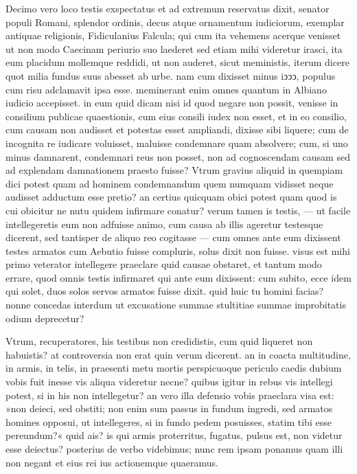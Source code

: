  Decimo vero loco testis exspectatus et ad extremum reservatus dixit, senator populi Romani, splendor ordinis, decus atque ornamentum iudiciorum, exemplar antiquae religionis, Fidiculanius Falcula; qui cum ita vehemens acerque venisset ut non modo Caecinam periurio suo laederet sed etiam mihi videretur irasci, ita eum placidum mollemque reddidi, ut non auderet, sicut meministis, iterum dicere quot milia fundus suus abesset ab urbe. nam cum dixisset minus iↄↄↄ, populus cum risu adclamavit ipsa esse. meminerant enim omnes quantum in Albiano iudicio accepisset.  in eum quid dicam nisi id quod negare non possit, venisse in consilium publicae quaestionis, cum eius consili iudex non esset, et in eo consilio, cum causam non audisset et potestas esset ampliandi, dixisse sibi liquere; cum de incognita re iudicare voluisset, maluisse condemnare quam absolvere; cum, si uno minus damnarent, condemnari reus non posset, non ad cognoscendam causam sed ad explendam damnationem praesto fuisse? Vtrum gravius aliquid in quempiam dici potest quam ad hominem condemnandum quem numquam vidisset neque audisset adductum esse pretio? an certius quicquam obici potest quam quod is cui obicitur ne nutu quidem infirmare conatur?  verum tamen is testis, — ut facile intellegeretis eum non adfuisse animo, cum causa ab illis ageretur testesque dicerent, sed tantisper de aliquo reo cogitasse — cum omnes ante eum dixissent testes armatos cum Aebutio fuisse compluris, solus dixit non fuisse. visus est mihi primo veterator intellegere praeclare quid causae obstaret, et tantum modo errare, quod omnis testis infirmaret qui ante eum dixissent: cum subito, ecce idem qui solet, duos solos servos armatos fuisse dixit. quid huic tu homini facias? nonne concedas interdum ut excusatione summae stultitiae summae improbitatis odium deprecetur?

 Vtrum, recuperatores, his testibus non credidistis, cum quid liqueret non habuistis? at controversia non erat quin verum dicerent. an in coacta multitudine, in armis, in telis, in praesenti metu mortis perspicuoque periculo caedis dubium vobis fuit inesse vis aliqua videretur necne? quibus igitur in rebus vis intellegi potest, si in his non intellegetur? an vero illa defensio vobis praeclara visa est: »non deieci, sed obstiti; non enim sum passus in fundum ingredi, sed armatos homines opposui, ut intellegeres, si in fundo pedem posuisses, statim tibi esse pereundum?« quid ais? is qui armis proterritus, fugatus, pulsus est, non videtur esse deiectus?  posterius de verbo videbimus; nunc rem ipsam ponamus quam illi non negant et eius rei ius actionemque quaeramus.

